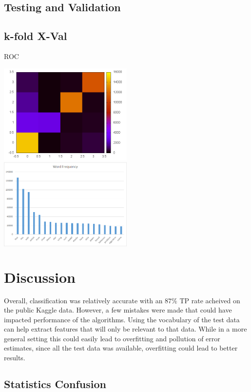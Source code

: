 \documentclass[10pt,twocolumn]{article}
\begin{document}
\subsection{Testing and Validation}

\subsection*{k-fold X-Val}

ROC

\includegraphics[width=0.5\textwidth]{./confusion.png}
\includegraphics[width=0.5\textwidth]{./word_frequency.png}

\section*{Discussion}

Overall, classification was relatively accurate with an $87\%$ TP rate acheived on the public Kaggle data. However, a few mistakes were made that could have impacted performance of the algorithms. Using the vocabulary of the test data can help extract features that will only be relevant to that data.  While in a more general setting this could easily lead to overfitting and pollution of error estimates, since all the test data was available, overfitting could lead to better results. 

\subsection*{Statistics Confusion}
\end{document}
